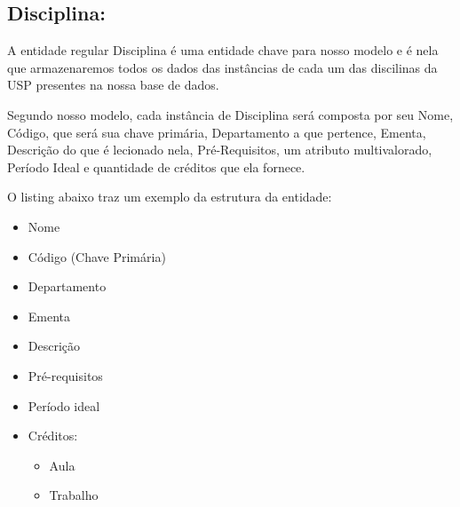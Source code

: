 \documentclass{report}
\begin{document}
\subsection{Disciplina:}
A entidade regular Disciplina é uma entidade chave para nosso modelo e é nela que armazenaremos todos os dados das instâncias de cada um das discilinas da USP presentes na nossa base de dados.
	
	Segundo nosso modelo, cada instância de Disciplina será composta por seu Nome, Código, que será sua chave primária, Departamento a que pertence, Ementa, Descrição do que é lecionado nela, Pré-Requisitos, um atributo multivalorado, Período Ideal e quantidade de créditos que ela fornece.
		
	O listing abaixo traz um exemplo da estrutura da entidade:
\begin{itemize}
  \item Nome
  \item Código (Chave Primária)
  \item Departamento
  \item Ementa
  \item Descrição
  \item Pré-requisitos
  \item Período ideal
  \item Créditos:
  \begin{itemize}
  	\item Aula
  	\item Trabalho
  	\end{itemize}
\end{itemize}
\end{document}
